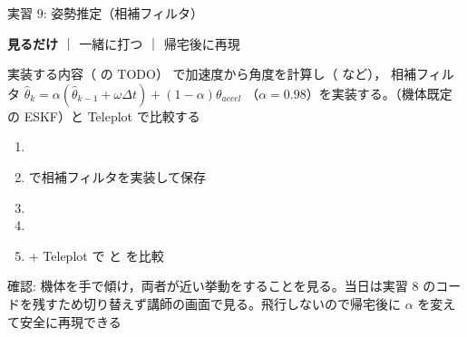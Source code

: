 \begin{frame}[fragile]{実習 9: 姿勢推定（相補フィルタ）}
  \vspace{0.15em}

  {\footnotesize \textcolor{sfblue}{\textbf{見るだけ}} ｜ 一緒に打つ ｜ 帰宅後に再現}

  \vspace{0.3em}

  \begin{block}{実装する内容（ の TODO）}\footnotesize
     で加速度から角度を計算し（ など），
    相補フィルタ $\hat\theta_k=\alpha(\hat\theta_{k-1}+\omega\Delta t)+(1-\alpha)\theta_{accel}$
    （$\alpha=0.98$）を実装する。（機体既定の ESKF）と
    Teleplot で比較する
  \end{block}

  \begin{enumerate}\footnotesize\setlength{\itemsep}{0pt}
    \item {}
    \item {} で相補フィルタを実装して保存
    \item {}
    \item {}
    \item {} + Teleplot で  と  を比較
  \end{enumerate}

  {\footnotesize 確認: 機体を手で傾け，両者が近い挙動をすることを見る。当日は実習 8 のコードを残すため切り替えず講師の画面で見る。飛行しないので帰宅後に $\alpha$ を変えて安全に再現できる}
\end{frame}

